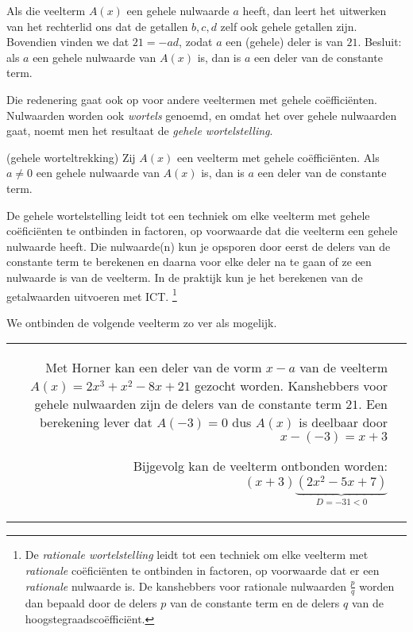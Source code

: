 \documentclass{ximera}
\begin{document}
Als die veelterm $A(x)$ een gehele nulwaarde $a$ heeft, dan leert het uitwerken van het rechterlid ons dat de getallen $b,c,d$ zelf ook gehele getallen zijn. Bovendien vinden we dat $21 = -ad$, zodat $a$ een (gehele) deler is van $21$. Besluit: als $a$ een gehele nulwaarde van $A(x)$ is, dan is $a$ een deler van de constante term. 

Die redenering gaat ook op voor andere veeltermen met gehele coëfficiënten. Nulwaarden worden ook \textit{ wortels} genoemd, en omdat het over gehele nulwaarden gaat, noemt men het resultaat de \textit{ gehele wortelstelling}. 


\begin{theorem}(gehele worteltrekking)
Zij $A(x)$ een veelterm met gehele coëfficiënten. Als $a \neq 0$ een gehele nulwaarde van $A(x)$ is, dan is $a$ een deler van de constante term. 
\end{theorem} 



De gehele wortelstelling leidt tot een techniek om elke veelterm met gehele coëficiënten te ontbinden in factoren, op voorwaarde dat die veelterm een gehele nulwaarde heeft. Die nulwaarde(n) kun je opsporen door eerst de delers van de constante term te berekenen en daarna voor elke deler na te gaan of ze een nulwaarde is van de veelterm. In de praktijk kun je het berekenen van de getalwaarden uitvoeren met ICT. \footnote{De \textit{ rationale wortelstelling} leidt tot een techniek om elke veelterm met \textit{ rationale} coëficiënten 
te ontbinden in factoren, op voorwaarde dat er een \textit{ rationale} nulwaarde is. De kanshebbers voor rationale nulwaarden $\frac{p}{q}$ worden dan bepaald door de delers $p$ van de constante term en de delers $q$ van de hoogstegraadscoëfficiënt.}

\begin{example} 
We ontbinden de volgende veelterm zo ver als mogelijk.
\renewcommand{\kolbreed}{\widthof{$-21$}}


\begin{tabular}{rl}

Met Horner kan een deler van de vorm \(x-a\) van de veelterm \(A(x) = 2x^3 + x^2 - 8x + 21\) gezocht worden. Kanshebbers voor gehele nulwaarden zijn de delers van de constante term $21$. Een berekening lever dat \( A(-3) = 0 \) dus $A(x)$ is deelbaar door $x- (-3) = x+3$





Bijgevolg kan de veelterm ontbonden worden: \( (x+3)\underbrace{(2x^2-5x+7)}_{D = -31 < 0} \)
\end{tabular}

\end{example} 
\end{document}
